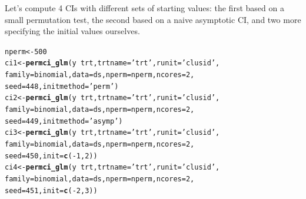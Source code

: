 \documentclass[12pt]{article}\usepackage[]{graphicx}\usepackage[]{color}
\makeatletter
\newcommand{\hlnum}[1]{\textcolor[rgb]{0.686,0.059,0.569}{#1}}%
\newcommand{\hlstr}[1]{\textcolor[rgb]{0.192,0.494,0.8}{#1}}%
\newcommand{\hlopt}[1]{\textcolor[rgb]{0,0,0}{#1}}%
\newcommand{\hlstd}[1]{\textcolor[rgb]{0.345,0.345,0.345}{#1}}%
\newcommand{\hlkwb}[1]{\textcolor[rgb]{0.69,0.353,0.396}{#1}}%
\newcommand{\hlkwc}[1]{\textcolor[rgb]{0.333,0.667,0.333}{#1}}%
\newcommand{\hlkwd}[1]{\textcolor[rgb]{0.737,0.353,0.396}{\textbf{#1}}}%
\newenvironment{kframe}{%
 \def\at@end@of@kframe{}%
 \ifinner\ifhmode%
  \def\at@end@of@kframe{\end{minipage}}%
  \begin{minipage}{\columnwidth}%
 \fi\fi%
 \def\FrameCommand##1{\hskip\@totalleftmargin \hskip-\fboxsep
 \colorbox{shadecolor}{##1}\hskip-\fboxsep
     \hskip-\linewidth \hskip-\@totalleftmargin \hskip\columnwidth}%
 \MakeFramed {\advance\hsize-\width
   \@totalleftmargin\z@ \linewidth\hsize
   \@setminipage}}%
 {\par\unskip\endMakeFramed%
 \at@end@of@kframe}
\newenvironment{knitrout}{}{} %
\makeatother
\begin{document}
Let's compute 4 CIs with different sets of starting values: the first based on a small permutation test, the second based on a naive asymptotic CI, and two more specifying the initial values ourselves.
\begin{knitrout}
\color{fgcolor}\begin{kframe}
\begin{alltt}
\hlstd{nperm} \hlkwb{<-} \hlnum{500}
\hlstd{ci1} \hlkwb{<-} \hlkwd{permci_glm}\hlstd{(y} \hlopt{~} \hlstd{trt,} \hlkwc{trtname} \hlstd{=} \hlstr{'trt'}\hlstd{,} \hlkwc{runit} \hlstd{=} \hlstr{'clusid'}\hlstd{,}
                  \hlkwc{family} \hlstd{= binomial,} \hlkwc{data} \hlstd{= ds,} \hlkwc{nperm} \hlstd{= nperm,} \hlkwc{ncores} \hlstd{=} \hlnum{2}\hlstd{,}
                  \hlkwc{seed} \hlstd{=} \hlnum{448}\hlstd{,} \hlkwc{initmethod} \hlstd{=} \hlstr{'perm'}\hlstd{)}
\hlstd{ci2} \hlkwb{<-} \hlkwd{permci_glm}\hlstd{(y} \hlopt{~} \hlstd{trt,} \hlkwc{trtname} \hlstd{=} \hlstr{'trt'}\hlstd{,} \hlkwc{runit} \hlstd{=} \hlstr{'clusid'}\hlstd{,}
                  \hlkwc{family} \hlstd{= binomial,} \hlkwc{data} \hlstd{= ds,} \hlkwc{nperm} \hlstd{= nperm,} \hlkwc{ncores} \hlstd{=} \hlnum{2}\hlstd{,}
                  \hlkwc{seed} \hlstd{=} \hlnum{449}\hlstd{,} \hlkwc{initmethod} \hlstd{=} \hlstr{'asymp'}\hlstd{)}
\hlstd{ci3} \hlkwb{<-} \hlkwd{permci_glm}\hlstd{(y} \hlopt{~} \hlstd{trt,} \hlkwc{trtname} \hlstd{=} \hlstr{'trt'}\hlstd{,} \hlkwc{runit} \hlstd{=} \hlstr{'clusid'}\hlstd{,}
                  \hlkwc{family} \hlstd{= binomial,} \hlkwc{data} \hlstd{= ds,} \hlkwc{nperm} \hlstd{= nperm,} \hlkwc{ncores} \hlstd{=} \hlnum{2}\hlstd{,}
                  \hlkwc{seed} \hlstd{=} \hlnum{450}\hlstd{,} \hlkwc{init} \hlstd{=} \hlkwd{c}\hlstd{(}\hlopt{-}\hlnum{1}\hlstd{,} \hlnum{2}\hlstd{))}
\hlstd{ci4} \hlkwb{<-} \hlkwd{permci_glm}\hlstd{(y} \hlopt{~} \hlstd{trt,} \hlkwc{trtname} \hlstd{=} \hlstr{'trt'}\hlstd{,} \hlkwc{runit} \hlstd{=} \hlstr{'clusid'}\hlstd{,}
                  \hlkwc{family} \hlstd{= binomial,} \hlkwc{data} \hlstd{= ds,} \hlkwc{nperm} \hlstd{= nperm,} \hlkwc{ncores} \hlstd{=} \hlnum{2}\hlstd{,}
                  \hlkwc{seed} \hlstd{=} \hlnum{451}\hlstd{,} \hlkwc{init} \hlstd{=} \hlkwd{c}\hlstd{(}\hlopt{-}\hlnum{2}\hlstd{,} \hlnum{3}\hlstd{))}
\end{alltt}
\end{kframe}
\end{knitrout}
\end{document}
